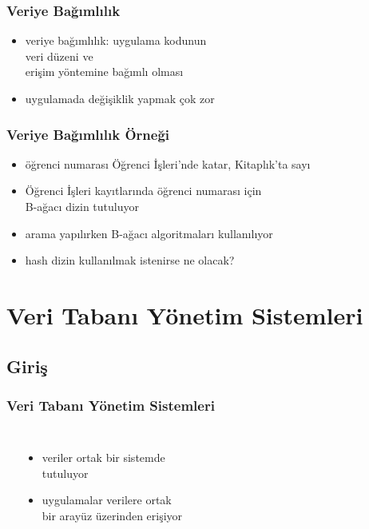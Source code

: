 \documentclass[dvipsnames]{beamer}
\theoremstyle{plain}
\begin{document}
\begin{frame}
  \frametitle{Veriye Bağımlılık}

  \begin{itemize}
    \item \alert{veriye bağımlılık}: uygulama kodunun\\
       veri düzeni ve \\
       erişim yöntemine bağımlı olması

    \medskip
   \item uygulamada değişiklik yapmak çok zor
    \end{itemize}
\end{frame}

\begin{frame}
  \frametitle{Veriye Bağımlılık Örneği}

  \begin{itemize}
      \item öğrenci numarası Öğrenci İşleri'nde katar, Kitaplık'ta sayı

      \medskip
      \item Öğrenci İşleri kayıtlarında öğrenci numarası için\\
        B-ağacı dizin tutuluyor
      \item arama yapılırken B-ağacı algoritmaları kullanılıyor
      \smallskip 
      
      \item hash dizin kullanılmak istenirse ne olacak?     
      
    \end{itemize}
  \end{frame}

\section{Veri Tabanı Yönetim Sistemleri}

\subsection{Giriş}

\begin{frame}
  \frametitle{Veri Tabanı Yönetim Sistemleri}

  \begin{columns}[b]
    \begin{center}
    \end{center}

    \begin{itemize}
      \item veriler ortak bir sistemde\\
        tutuluyor
      \item uygulamalar verilere ortak\\
        bir arayüz üzerinden erişiyor
    \end{itemize}
  \end{columns}
\end{frame}
\end{document}
